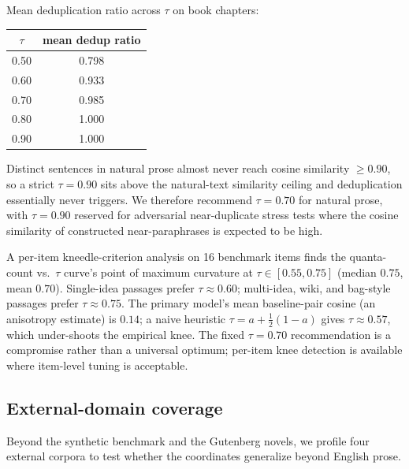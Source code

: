 \documentclass[11pt]{article}
\begin{document}
Mean deduplication ratio across $\tau$ on book chapters:

\begin{center}
\begin{tabular}{cc}
\toprule
$\tau$ & mean dedup ratio \\
\midrule
0.50 & 0.798 \\
0.60 & 0.933 \\
0.70 & 0.985 \\
0.80 & 1.000 \\
0.90 & 1.000 \\
\bottomrule
\end{tabular}
\end{center}

Distinct sentences in natural prose almost never reach cosine similarity $\geq 0.90$, so a strict $\tau = 0.90$ sits above the natural-text similarity ceiling and deduplication essentially never triggers. We therefore recommend $\tau = 0.70$ for natural prose, with $\tau = 0.90$ reserved for adversarial near-duplicate stress tests where the cosine similarity of constructed near-paraphrases is expected to be high.

A per-item kneedle-criterion analysis on 16 benchmark items finds the quanta-count vs.\ $\tau$ curve's point of maximum curvature at $\tau \in [0.55, 0.75]$ (median $0.75$, mean $0.70$). Single-idea passages prefer $\tau \approx 0.60$; multi-idea, wiki, and bag-style passages prefer $\tau \approx 0.75$. The primary model's mean baseline-pair cosine (an anisotropy estimate) is $0.14$; a naive heuristic $\tau = a + \tfrac{1}{2}(1-a)$ gives $\tau \approx 0.57$, which under-shoots the empirical knee. The fixed $\tau = 0.70$ recommendation is a compromise rather than a universal optimum; per-item knee detection is available where item-level tuning is acceptable.

\subsection{External-domain coverage}\label{sec:domains}

Beyond the synthetic benchmark and the Gutenberg novels, we profile four external corpora to test whether the coordinates generalize beyond English prose.
\end{document}
